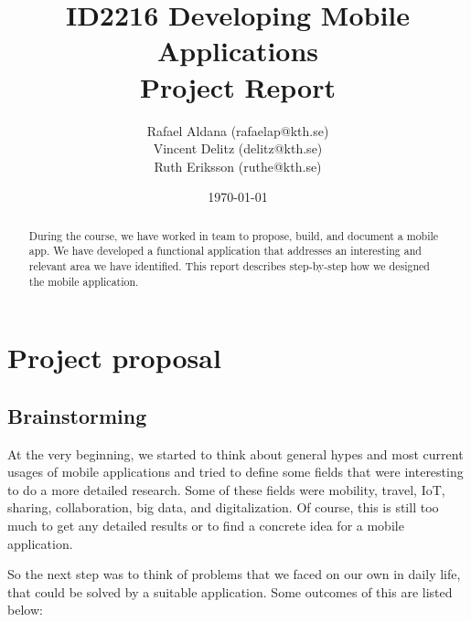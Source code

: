 \documentclass[11pt,twoside,a4paper]{report}
\begin{document}
\title{ID2216 Developing Mobile Applications\\Project Report}
\author{Rafael Aldana (rafaelap@kth.se)\\Vincent Delitz (delitz@kth.se)\\Ruth Eriksson (ruthe@kth.se)}
\date{\today}
\maketitle

\begin{abstract}
During the course, we have worked in team to propose, build, and document a mobile app. We have developed a functional application that addresses an interesting and relevant area we have identified. This report describes step-by-step how we designed the mobile application.
\end{abstract}

\tableofcontents

\renewcommand{\chaptername}{Section}
\setcounter{chapter}{0}
\chapter{Project proposal}

\section{Brainstorming}

At the very beginning, we started to think about general hypes and most current usages of mobile applications and tried to define some fields that were interesting to do a more detailed research. Some of these fields were mobility, travel, IoT, sharing, collaboration, big data, and digitalization. Of course, this is still too much to get any detailed results or to find a concrete idea for a mobile application.

So the next step was to think of problems that we faced on our own in daily life, that could be solved by a suitable application. Some outcomes of this are listed below:
\end{document}
